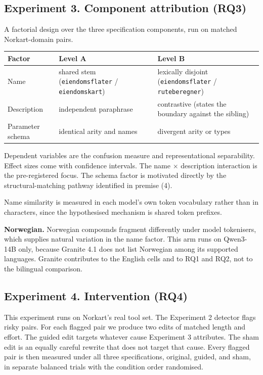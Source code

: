 \documentclass[11pt,a4paper]{article}
\begin{document}
\subsection*{Experiment 3. Component attribution (RQ3)}

A factorial design over the three specification components, run on matched Norkart-domain pairs.

\begin{tabular}{@{}L{2.8cm}L{5.9cm}L{6.5cm}@{}}
\toprule
\textbf{Factor} & \textbf{Level A} & \textbf{Level B} \\
\midrule
Name & shared stem (\texttt{eiendomsflater} / \texttt{eiendomskart}) & lexically disjoint (\texttt{eiendomsflater} / \texttt{ruteberegner}) \\
Description & independent paraphrase & contrastive (states the boundary against the sibling) \\
Parameter schema & identical arity and names & divergent arity or types \\
\bottomrule
\end{tabular}

Dependent variables are the confusion measure and representational separability. Effect sizes
come with confidence intervals. The name $\times$ description interaction is the pre-registered focus.
The schema factor is motivated directly by the structural-matching pathway identified in premise
(4).

Name similarity is measured in each model's own token vocabulary rather than in characters, since
the hypothesised mechanism is shared token prefixes.

\textbf{Norwegian.} Norwegian compounds fragment differently under model tokenisers, which supplies
natural variation in the name factor. This arm runs on Qwen3-14B only, because Granite 4.1 does
not list Norwegian among its supported languages. Granite contributes to the English cells and to
RQ1 and RQ2, not to the bilingual comparison.

\subsection*{Experiment 4. Intervention (RQ4)}

This experiment runs on Norkart's real tool set. The Experiment 2 detector flags risky pairs. For each
flagged pair we produce two edits of matched length and effort. The guided edit targets whatever
cause Experiment 3 attributes. The sham edit is an equally careful rewrite that does not target that
cause. Every flagged pair is then measured under all three specifications, original, guided, and
sham, in separate balanced trials with the condition order randomised.
\end{document}
